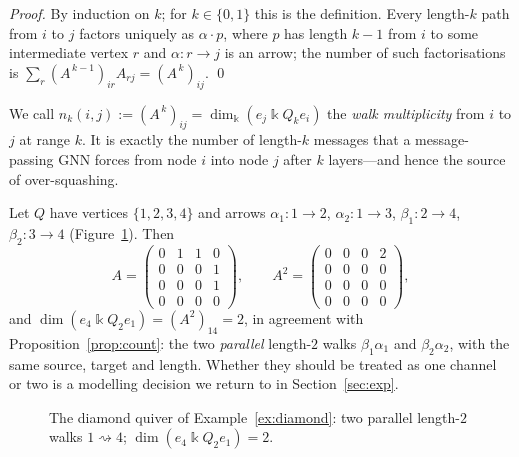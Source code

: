 \documentclass[runningheads]{llncs}
\newcommand{\kk}{\Bbbk}
\newcommand{\kQ}{\kk Q}
\newcommand{\Adj}{A}
\newcommand{\walk}{\rightsquigarrow}
\begin{document}
\begin{proof}
By induction on $k$; for $k\in\{0,1\}$ this is the definition. Every length-$k$
path from $i$ to $j$ factors uniquely as $\alpha\cdot p$, where $p$ has length
$k-1$ from $i$ to some intermediate vertex $r$ and $\alpha\colon r\to j$ is an
arrow; the number of such factorisations is
$\sum_r(\Adj^{\,k-1})_{ir}\Adj_{rj}=(\Adj^{\,k})_{ij}$. \qed
\end{proof}

We call $n_k(i,j):=(\Adj^{\,k})_{ij}=\dim_\kk(e_j\kQ_k e_i)$ the \emph{walk
multiplicity} from $i$ to $j$ at range $k$. It is exactly the number of
length-$k$ messages that a message-passing GNN forces from node $i$ into node
$j$ after $k$ layers---and hence the source of over-squashing.

\begin{example}\label{ex:diamond}
Let $Q$ have vertices $\{1,2,3,4\}$ and arrows $\alpha_1\colon1\to2$,
$\alpha_2\colon1\to3$, $\beta_1\colon2\to4$, $\beta_2\colon3\to4$
(Figure~\ref{fig:diamond}). Then
\[
  \Adj=\begin{pmatrix}0&1&1&0\\0&0&0&1\\0&0&0&1\\0&0&0&0\end{pmatrix},
  \qquad
  \Adj^2=\begin{pmatrix}0&0&0&2\\0&0&0&0\\0&0&0&0\\0&0&0&0\end{pmatrix},
\]
and $\dim(e_4\kQ_2e_1)=(\Adj^2)_{14}=2$, in agreement with
Proposition~\ref{prop:count}: the two \emph{parallel} length-$2$ walks
$\beta_1\alpha_1$ and $\beta_2\alpha_2$, with the same source, target and
length. Whether they should be treated as one channel or two is a modelling
decision we return to in Section~\ref{sec:exp}.
\end{example}

\begin{figure}[t]
\centering
{}
\caption{The diamond quiver of Example~\ref{ex:diamond}: two parallel
length-$2$ walks $1\walk4$; $\dim(e_4\kQ_2 e_1)=2$.}
\label{fig:diamond}
\end{figure}
\end{document}
